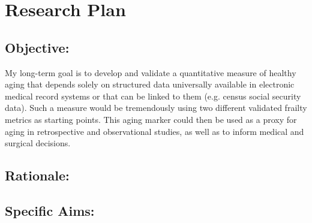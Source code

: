 \section{Research Plan }\label{research-plan}


\subsection{Objective:}\label{objective}
  
My long-term goal is to develop and validate a quantitative measure of healthy aging that depends solely on structured data universally available in electronic medical record systems or that can be linked to them (e.g. census social security data). Such a measure would be tremendously 
using two different validated frailty metrics as starting points. This
aging marker could then be used as a proxy for aging in retrospective
and observational studies, as well as to inform medical and surgical
decisions.


\subsection{Rationale:}\label{rationale}

\subsection{Specific Aims:}\label{specific-aims}
